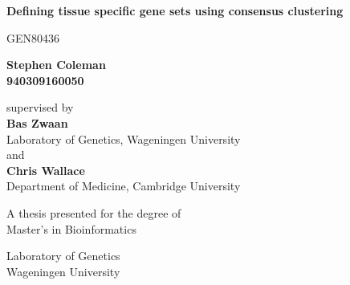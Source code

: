 \documentclass[12pt]{article} %
\begin{document}
 \pgfplotsset{compat=1.15}
	
	\begin{titlepage}
		\begin{center}
			\vspace*{1cm}
			
			\par{\LARGE \textbf{Defining tissue specific gene sets using consensus clustering}}
			
			\vspace{1.25cm}
			GEN80436
			
			\vspace{1.8cm}
			
			\textbf{Stephen Coleman \\ 940309160050}
			
			\vspace{2.5cm}
			
			supervised by \\
			\textbf{Bas Zwaan} \\
			Laboratory of Genetics, Wageningen University \\
			and \\
			\textbf{Chris Wallace} \\
			Department of Medicine, Cambridge University
			

			
	
		
			\vfill		
			
			A thesis presented for the degree of\\
			Master's in Bioinformatics
			
			\vspace{1.8cm}
			
			
			Laboratory of Genetics \\
			Wageningen University
			
		\end{center}
	\end{titlepage}
	
\end{document}

